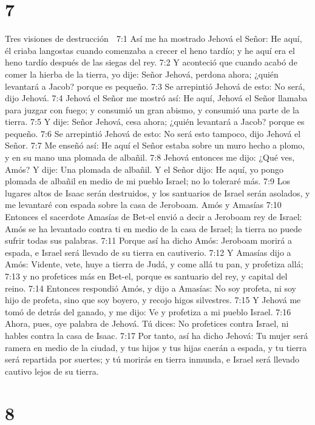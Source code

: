 \chapter{7}

Tres visiones de destrucción  

7:1 Así me ha mostrado Jehová el Señor: He aquí, él criaba langostas cuando comenzaba a crecer el heno tardío; y he aquí era el heno tardío después de las siegas del rey.  
7:2 Y aconteció que cuando acabó de comer la hierba de la tierra, yo dije: Señor Jehová, perdona ahora; ¿quién levantará a Jacob? porque es pequeño.  
7:3 Se arrepintió Jehová de esto: No será, dijo Jehová.  
7:4 Jehová el Señor me mostró así: He aquí, Jehová el Señor llamaba para juzgar con fuego; y consumió un gran abismo, y consumió una parte de la tierra.  
7:5 Y dije: Señor Jehová, cesa ahora; ¿quién levantará a Jacob? porque es pequeño.  
7:6 Se arrepintió Jehová de esto: No será esto tampoco, dijo Jehová el Señor.  
7:7 Me enseñó así: He aquí el Señor estaba sobre un muro hecho a plomo, y en su mano una plomada de albañil.  
7:8 Jehová entonces me dijo: ¿Qué ves, Amós? Y dije: Una plomada de albañil. Y el Señor dijo: He aquí, yo pongo plomada de albañil en medio de mi pueblo Israel; no lo toleraré más.  
7:9 Los lugares altos de Isaac serán destruidos, y los santuarios de Israel serán asolados, y me levantaré con espada sobre la casa de Jeroboam.  
Amós y Amasías  
7:10 Entonces el sacerdote Amasías de Bet-el envió a decir a Jeroboam rey de Israel: Amós se ha levantado contra ti en medio de la casa de Israel; la tierra no puede sufrir todas sus palabras.  
7:11 Porque así ha dicho Amós: Jeroboam morirá a espada, e Israel será llevado de su tierra en cautiverio.  
7:12 Y Amasías dijo a Amós: Vidente, vete, huye a tierra de Judá, y come allá tu pan, y profetiza allá;  
7:13 y no profetices más en Bet-el, porque es santuario del rey, y capital del reino.  
7:14 Entonces respondió Amós, y dijo a Amasías: No soy profeta, ni soy hijo de profeta, sino que soy boyero, y recojo higos silvestres.  
7:15 Y Jehová me tomó de detrás del ganado, y me dijo: Ve y profetiza a mi pueblo Israel.  
7:16 Ahora, pues, oye palabra de Jehová. Tú dices: No profetices contra Israel, ni hables contra la casa de Isaac.  
7:17 Por tanto, así ha dicho Jehová: Tu mujer será ramera en medio de la ciudad, y tus hijos y tus hijas caerán a espada, y tu tierra será repartida por suertes; y tú morirás en tierra inmunda, e Israel será llevado cautivo lejos de su tierra.  

\chapter{8}

